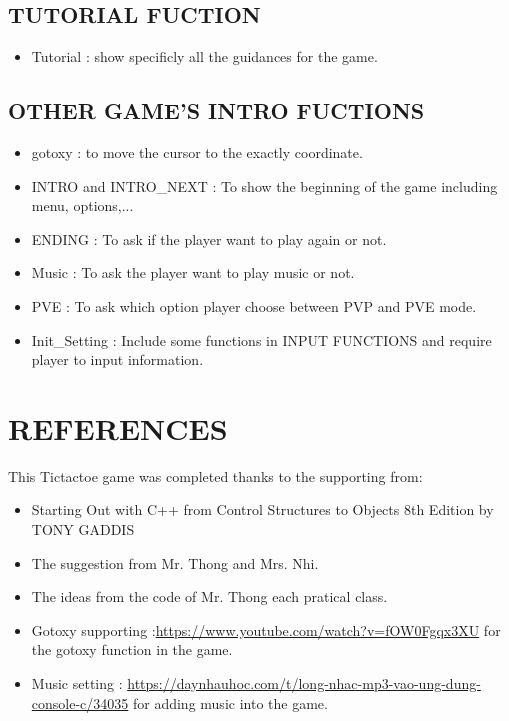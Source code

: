 \documentclass[12pt,a4paper]{article}
\begin{document}
\Large \subsection{\color{blue}\textbf{TUTORIAL FUCTION} }
\begin{itemize}
    \item Tutorial : show specificly all the guidances for the game.
\end{itemize}
\Large \subsection{\color{blue}\textbf{OTHER GAME'S INTRO FUCTIONS} }
\begin{itemize}
    \item gotoxy : to move the cursor to the exactly coordinate.
    \item INTRO and INTRO\_NEXT : To show the beginning of the game including menu, options,...
    \item ENDING : To ask if the player want to play again or not.
    \item Music : To ask the player want to play music or not.
    \item PVE : To ask which option player choose between PVP and PVE mode.
    \item Init\_Setting : Include some functions in INPUT FUNCTIONS and require player to input information.
\end{itemize}
\section{\textbf{\color{red}REFERENCES}}
This Tictactoe game was completed thanks to the supporting from:
\begin{itemize}
    \item Starting Out with C++ from Control Structures to Objects 8th Edition by TONY GADDIS
    \item The suggestion from Mr. Thong and Mrs. Nhi.
    \item The ideas from the code of Mr. Thong each pratical class.
    \item Gotoxy supporting :\url{https://www.youtube.com/watch?v=fOW0Fgqx3XU} for the gotoxy function in the game.
    \item Music setting : \url{https://daynhauhoc.com/t/long-nhac-mp3-vao-ung-dung-console-c/34035} for adding music into the game.
\end{itemize}
\end{document}
